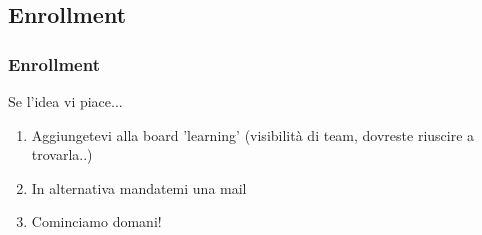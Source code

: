 \documentclass{beamer}
\begin{document}
\subsection{Enrollment}
\begin{frame}
	\frametitle{Enrollment}	
	Se l'idea vi piace...
	\begin{enumerate}
  		\item<+-> Aggiungetevi alla board 'learning' (visibilità di team, dovreste riuscire a trovarla..)
  		\item<+-> In alternativa mandatemi una mail
  		\item<+-> Cominciamo domani!
	\end{enumerate}
\end{frame}
\end{document}
